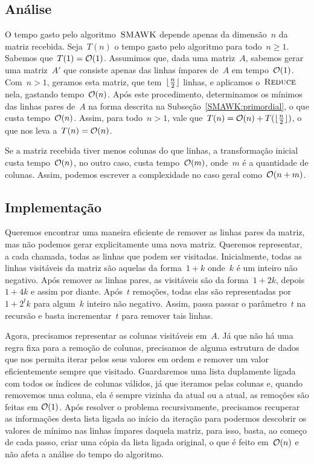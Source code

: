 \subsection{Análise}
O tempo gasto pelo algoritmo~$\textsc{SMAWK}$ depende apenas da dimensão~$n$ da matriz recebida. Seja~$T(n)$ o tempo gasto pelo algoritmo para todo~$n \geq 1$. Sabemos que~$T(1) = \mathcal{O}(1)$. Assumimos que, dada uma matriz~$A$, sabemos gerar uma matriz~$A'$ que consiste apenas das linhas ímpares de~$A$ em tempo~$\mathcal{O}(1)$. Com~$n > 1$, geramos esta matriz, que tem~$\lfloor\frac{n}{2}\rfloor$ linhas, e aplicamos o~$\textsc{Reduce}$ nela, gastando tempo~$\mathcal{O}(n)$. Após este procedimento, determinamos os mínimos das linhas pares de~$A$ na forma descrita na Subseção~\ref{SMAWK:primordial}, o que custa tempo~$\mathcal{O}(n)$. Assim, para todo~${ n > 1 }$, vale que~${ T(n) = \mathcal{O}(n) + T(\lfloor\frac{n}{2}\rfloor) }$, o que nos leva a~${ T(n) = \mathcal{O}(n) }$.

Se a matriz recebida tiver menos colunas do que linhas, a transformação inicial custa tempo~$\mathcal{O}(n)$, no outro caso, custa tempo~$\mathcal{O}(m)$, onde~$m$ é a quantidade de colunas. Assim, podemos escrever a complexidade no caso geral como~$\mathcal{O}(n+m)$.


\subsection{Implementação}
Queremos encontrar uma maneira eficiente de remover as linhas pares da matriz, mas não podemos gerar explicitamente uma nova matriz. Queremos representar, a cada chamada, todas as linhas que podem ser visitadas. Inicialmente, todas as linhas visitáveis da matriz são aquelas da forma~${ 1 + k }$ onde~$k$ é um inteiro não negativo. Após remover as linhas pares, as visitáveis são da forma~${ 1 + 2k }$, depois~${ 1 + 4k }$ e assim por diante. Após~$t$ remoções, todas elas são representadas por~${ 1 + 2^tk }$ para algum~$k$ inteiro não negativo. Assim, passa passar o parâmetro~$t$ na recursão e basta incrementar~$t$ para remover tais linhas.

Agora, precisamos representar as colunas visitáveis em~$A$. Já que não há uma regra fixa para a remoção de colunas, precisamos de alguma estrutura de dados que nos permita iterar pelos seus valores em ordem e remover um valor eficientemente sempre que visitado. Guardaremos uma lista duplamente ligada com todos os índices de colunas válidos, já que iteramos pelas colunas e, quando removemos uma coluna, ela é sempre vizinha da atual ou a atual, as remoções são feitas em $\mathcal{O}(1)$. Após resolver o problema recursivamente, precisamos recuperar as informações desta lista ligada ao início da iteração para podermos descobrir os valores de mínimo nas linhas ímpares daquela matriz, para isso, basta, ao começo de cada passo, criar uma cópia da lista ligada original, o que é feito em~$\mathcal{O}(n)$ e não afeta a análise do tempo do algoritmo.

